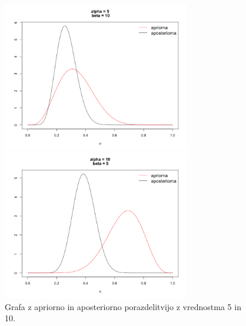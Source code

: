 \documentclass[a4paper,11pt]{article}
\begin{document}
\begin{figure}[ht!]
    \begin{minipage}{0.5\textwidth}
        \centering
        \includegraphics[width=82mm]{Slike/1_6.png}
    \end{minipage}\hfill
    \begin{minipage}{0.5\textwidth}
        \centering
        \includegraphics[width=82mm]{Slike/1_7.png}
    \end{minipage}\hfill
    \caption{Grafa z apriorno in aposteriorno porazdelitvijo z vrednostma 5 in 10.}
\end{figure}
\end{document}
